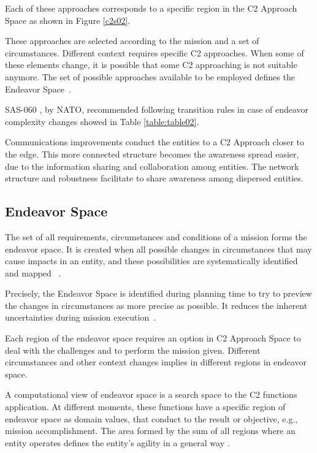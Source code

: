 Each of these approaches corresponds to a specific region in the C2 Approach Space as shown in Figure \ref{c2s02}.

%

These approaches are selected according to the mission and a set of circumstances. Different context requires specific \gls{C2} approaches. When some of these elements change, it is possible that some C2 approaching is not suitable anymore. The set of possible approaches available to be employed defines the Endeavor Space~\cite{FRANCE2014}.

SAS-060 \cite{nato01}, by \gls{NATO}, recommended following transition rules in case of endeavor complexity  changes showed in Table \ref{table:table02}.



Communications improvements conduct the entities to a C2 Approach closer to the edge. This more connected structure becomes the awareness spread easier, due to the information sharing and collaboration among entities. The network structure and robustness facilitate to share awareness among dispersed entities. 



\subsection{Endeavor Space}

The set of all requirements, circumstances and conditions of a mission forms the endeavor space. It is created when all possible changes in circumstances that may cause impacts in an entity, and these possibilities are systematically identified and mapped ~\cite{FRANCE2014}. 

Precisely, the Endeavor Space is identified during planning time to try to preview the changes in circumstances as more precise as possible. It reduces the inherent uncertainties during mission execution~\cite{FRANCE2014}.

Each region of the endeavor space requires an option in C2 Approach Space to deal with the challenges and to perform the mission given. Different circumstances and other context changes implies in different regions in endeavor space.

A computational view of endeavor space is a search space to the C2 functions application. At different moments, these functions have a specific region of endeavor space as domain values, that conduct to the result or objective, e.g., mission accomplishment. The area formed by the sum of all regions where an entity operates defines the entity's agility in a general way \cite{Alberts2011}.

